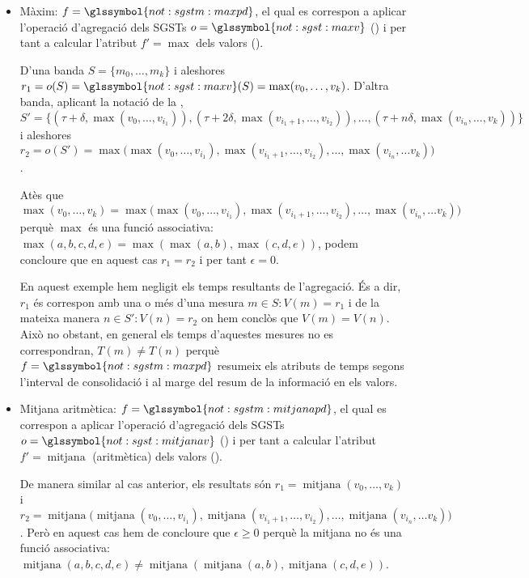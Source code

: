   \begin{itemize}
  \item Màxim: $f=\glssymbol{not:sgstm:maxpd}$, el qual es correspon
    a aplicar l'operació d'agregació dels \glspl{SGST}
    $o=\glssymbol{not:sgst:maxv}$ () i per
    tant a calcular l'atribut $f'=\max$ dels valors ().

    D'una banda $S=\{m_0,\dotsc,m_k\}$ i aleshores
    $r_1=o(S)=\glssymbol{not:sgst:maxv}(S) = \max(v_0,\dotsc,
    v_k)$. D'altra banda, aplicant la notació de la
    , $S'=\{ (\tau+\delta,
    \max(v_0,\dotsc,v_{i_1})),
    (\tau+2\delta,\max(v_{i_1+1},\dotsc,v_{i_2})), \dotsc,
    (\tau+n\delta,\max(v_{i_n}, \dotsc, v_k)) \}$ i aleshores
    $r_2=o(S')= \max\big( \max(v_0,\dotsc,v_{i_1}),
    \max(v_{i_1+1},\dotsc,v_{i_2}), \dotsc, \max(v_{i_n}, \dotsc v_k)
    \big)$.

    Atès que $\max(v_0,\dotsc, v_k) = \max\big(
    \max(v_0,\dotsc,v_{i_1}), \max(v_{i_1+1},\dotsc,v_{i_2}), \dotsc,
    \max(v_{i_n}, \dotsc v_k) \big)$ perquè $\max$ és una funció
    associativa: $\max(a,b,c,d,e) = \max( \max(a,b), \max(c,d,e))$,
    podem concloure que en aquest cas $r_1=r_2$ i per tant
    $\epsilon=0$.


    En aquest exemple hem negligit els temps resultants de
    l'agregació. És a dir, $r_1$ és correspon amb una o més d'una
    mesura $m\in S: V(m)=r_1$ i de la mateixa manera $n\in S':
    V(n)=r_2$ on hem conclòs que $V(m)=V(n)$. Això no obstant,
    en general els temps d'aquestes mesures no es correspondran,
    $T(m)\neq T(n)$ perquè $f=\glssymbol{not:sgstm:maxpd}$
    resumeix els atributs de temps segons l'interval de consolidació i
    al marge del resum de la informació en els valors.



  \item Mitjana aritmètica: $f=\glssymbol{not:sgstm:mitjanapd}$, el
    qual es correspon a aplicar l'operació d'agregació dels
    \glspl{SGST} $o=\glssymbol{not:sgst:mitjanav}$
    () i per tant a calcular l'atribut
    $f'=\operatorname{mitjana}$ (aritmètica) dels valors
    ().

    De manera similar al cas anterior, els resultats són
    $r_1=\operatorname{mitjana}(v_0,\dotsc, v_k)$ i
    $r_2=\operatorname{mitjana}\big(
    \operatorname{mitjana}(v_0,\dotsc,v_{i_1}),
    \operatorname{mitjana}(v_{i_1+1},\dotsc,v_{i_2}), \dotsc,
    \operatorname{mitjana}(v_{i_n}, \dotsc v_k) \big)$.  Però en
    aquest cas hem de concloure que $\epsilon\geq 0$ perquè
    la mitjana no és una funció associativa:
    $\operatorname{mitjana}(a,b,c,d,e) \neq \operatorname{mitjana}(
    \operatorname{mitjana}(a,b), \operatorname{mitjana}(c,d,e))$.
 



\end{itemize}

